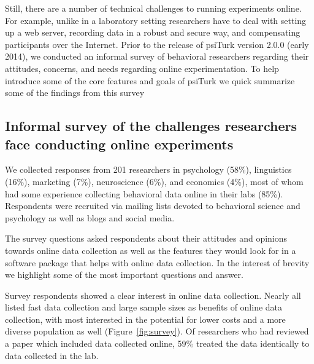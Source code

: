 \documentclass[twocolumn]{svjour3}          %
\begin{document}
Still, there are a number of technical challenges to running experiments online.
For example, unlike in a laboratory setting researchers have to 
deal with setting up a web server, recording data in a robust and secure way, 
and compensating participants over the Internet.  
Prior to the release of \textsf{psiTurk} version
2.0.0 (early 2014), we conducted an informal survey of behavioral researchers 
regarding their attitudes, concerns, and needs regarding online experimentation. 
To help introduce some of the core features and goals of \textsf{psiTurk} we 
quick summarize some of the findings from this survey



\subsection{Informal survey of the challenges researchers face conducting online experiments}
 We collected responses from 201 researchers in psychology (58\%),
linguistics (16\%), marketing (7\%), neuroscience (6\%), and economics (4\%), most of 
whom had some experience collecting behavioral data online in their labs (85\%).  
Respondents were recruited via mailing lists devoted to behavioral science and psychology 
as well as blogs and social media. 

The survey questions asked respondents about their attitudes and opinions towards
online data collection as well as the features they would look for in a software package
that helps with online data collection.  In the interest of brevity we highlight some of the
most important questions and answer.

Survey respondents showed a clear interest in online data collection. Nearly all listed fast data
collection and large sample sizes as benefits of online data collection, with most
interested in the potential for lower costs and a more diverse population as well 
(Figure~\ref{fig:survey}). Of researchers who had reviewed a paper which included data 
collected online, 59\% treated the data identically to data collected in the lab.


\end{document}
